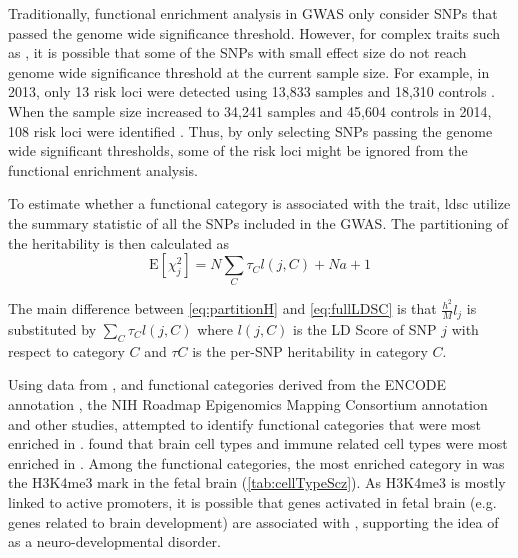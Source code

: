 	Traditionally, functional enrichment analysis in \gls{GWAS} only consider \glspl{SNP} that passed the genome wide significance threshold. 
	However, for complex traits such as , it is possible that some of the \glspl{SNP} with small effect size do not reach genome wide significance threshold at the current sample size.
	For example, in 2013, only 13 risk loci were detected using 13,833  samples and 18,310 controls \citep{Ripke2013}. 
	When the sample size increased to 34,241  samples and 45,604 controls in 2014, 108 risk loci were identified \citep{Ripke2014}. 
	Thus, by only selecting \glspl{SNP} passing the genome wide significant thresholds, some of the risk loci might be ignored from the functional enrichment analysis.
	
	To estimate whether a functional category is associated with the trait, \gls{ldsc} utilize the summary statistic of all the \glspl{SNP} included in the \gls{GWAS}.
	The partitioning of the heritability is then calculated as 
	\begin{equation}
	\mathrm{E}[\chi^2_j] = N\sum_C\tau_Cl(j,C)+Na+1
	\label{eq:partitionH}
	\end{equation}
	
	The main difference between \cref{eq:partitionH} and \cref{eq:fullLDSC} is that $\frac{h^2}{M}l_j$ is substituted by $\sum_C\tau_Cl(j,C)$ where $l(j,C)$ is the \gls{LD} Score of \gls{SNP} $j$ with respect to category $C$ and $\tau C$ is the per-\gls{SNP} heritability in category $C$.
	
	Using data from \citet{Ripke2014}, and functional categories derived from the ENCODE annotation \citep{ENCODEProjectConsortium2012}, the NIH Roadmap Epigenomics Mapping Consortium annotation \citep{Bernstein2010} and other studies, \citet{Finucane2015} attempted to identify functional categories that were most enriched in .
	\citet{Finucane2015} found that brain cell types and immune related cell types were most enriched in .
	Among the functional categories, the most enriched category in  was the H3K4me3 mark in the fetal brain (\cref{tab:cellTypeScz}). 
	As H3K4me3 is mostly linked to active promoters, it is possible that genes activated in fetal brain (e.g. genes related to brain development) are associated with , supporting the idea of  as a neuro-developmental disorder. 
	
